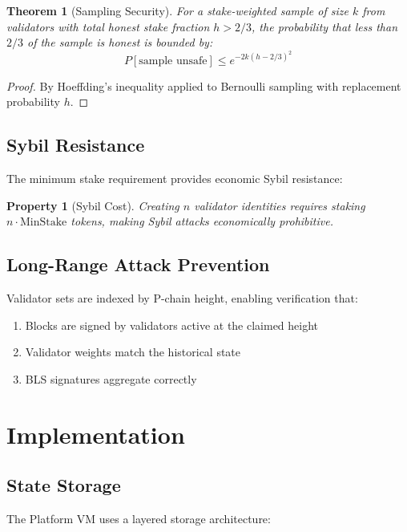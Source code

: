 \documentclass[11pt,letterpaper]{article}
\newtheorem{theorem}{Theorem}
\newtheorem{property}{Property}
\begin{document}
\begin{theorem}[Sampling Security]
For a stake-weighted sample of size $k$ from validators with total honest stake fraction $h > 2/3$, the probability that less than $2/3$ of the sample is honest is bounded by:
\begin{equation}
P[\text{sample unsafe}] \leq e^{-2k(h - 2/3)^2}
\end{equation}
\end{theorem}

\begin{proof}
By Hoeffding's inequality applied to Bernoulli sampling with replacement probability $h$.
\end{proof}

\subsection{Sybil Resistance}

The minimum stake requirement provides economic Sybil resistance:

\begin{property}[Sybil Cost]
Creating $n$ validator identities requires staking $n \cdot \text{MinStake}$ tokens, making Sybil attacks economically prohibitive.
\end{property}

\subsection{Long-Range Attack Prevention}

Validator sets are indexed by P-chain height, enabling verification that:
\begin{enumerate}
    \item Blocks are signed by validators active at the claimed height
    \item Validator weights match the historical state
    \item BLS signatures aggregate correctly
\end{enumerate}

\section{Implementation}

\subsection{State Storage}

The Platform VM uses a layered storage architecture:
\end{document}
